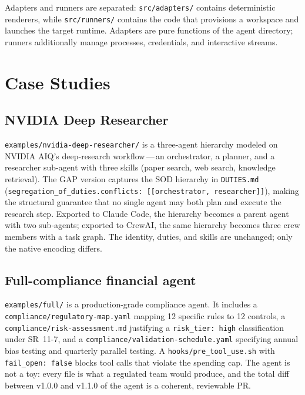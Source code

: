 \documentclass[11pt,a4paper]{article}
\begin{document}
Adapters and runners are separated: \texttt{src/adapters/} contains deterministic
renderers, while \texttt{src/runners/} contains the code that provisions a workspace
and launches the target runtime. Adapters are pure functions of the agent directory;
runners additionally manage processes, credentials, and interactive streams.

\section{Case Studies}\label{sec:cases}

\subsection{NVIDIA Deep Researcher}

\texttt{examples/nvidia-deep-researcher/} is a three-agent hierarchy modeled on NVIDIA
AIQ's deep-research workflow\,---\,an orchestrator, a planner, and a researcher
sub-agent with three skills (paper search, web search, knowledge retrieval). The GAP
version captures the SOD hierarchy in \texttt{DUTIES.md}
(\texttt{segregation\_of\_duties.conflicts: [[orchestrator, researcher]]}), making
the structural guarantee that no single agent may both plan and execute the research
step. Exported to Claude Code, the hierarchy becomes a parent agent with two
sub-agents; exported to CrewAI, the same hierarchy becomes three crew members with a
task graph. The identity, duties, and skills are unchanged; only the native encoding
differs.

\subsection{Full-compliance financial agent}

\texttt{examples/full/} is a production-grade compliance agent. It includes a
\texttt{compliance/regulatory-map.yaml} mapping 12 specific rules to 12 controls,
a \texttt{compliance/risk-assessment.md} justifying a \texttt{risk\_tier: high}
classification under SR~11-7, and a \texttt{compliance/validation-schedule.yaml}
specifying annual bias testing and quarterly parallel testing. A
\texttt{hooks/pre\_tool\_use.sh} with \texttt{fail\_open: false} blocks tool
calls that violate the spending cap. The agent is not a toy: every file is
what a regulated team would produce, and the total diff between v1.0.0 and
v1.1.0 of the agent is a coherent, reviewable PR.
\end{document}

